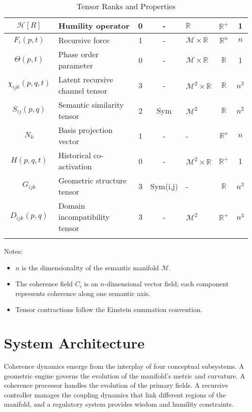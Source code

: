 {\begin{longtable}{|c|p{5.5cm}|c|c|p{1.5cm}|c|c|}
\hline
\(\mathcal{H}[R]\) & Humility operator & 0 & - & \(\mathbb{R}\) & \(\mathbb{R}^+\) & 1 \\
\hline
\(F_i(p,t)\) & Recursive force & 1 & - & \(\mathcal{M} \times \mathbb{R}\) & \(\mathbb{R}^n\) & \(n\) \\
\hline
\(\Theta(p,t)\) & Phase order parameter & 0 & - & \(\mathcal{M} \times \mathbb{R}\) & \(\mathbb{R}\) & 1 \\
\hline
\(\chi_{ijk}(p,q,t)\) & Latent recursive channel tensor & 3 & - & \(\mathcal{M}^2 \times \mathbb{R}\) & \(\mathbb{R}\) & \(n^3\) \\
\hline
\(S_{ij}(p,q)\) & Semantic similarity tensor & 2 & Sym & \(\mathcal{M}^2\) & \(\mathbb{R}\) & \(n^2\) \\
\hline
\(N_k\) & Basis projection vector & 1 & - & - & \(\mathbb{R}^n\) & \(n\) \\
\hline
\(H(p,q,t)\) & Historical co-activation & 0 & - & \(\mathcal{M}^2 \times \mathbb{R}\) & \(\mathbb{R}^+\) & 1 \\
\hline
\(G_{ijk}\) & Geometric structure tensor & 3 & Sym(i,j) & - & \(\mathbb{R}\) & \(n^3\) \\
\hline
\(D_{ijk}(p,q)\) & Domain incompatibility tensor & 3 & - & \(\mathcal{M}^2\) & \(\mathbb{R}^+\) & \(n^3\) \\
\hline
\caption{Tensor Ranks and Properties}
\end{longtable}
}

Notes:
\begin{itemize}
    \item \(n\) is the dimensionality of the semantic manifold \(\mathcal{M}\).
    \item The coherence field \(C_i\) is an \(n\)-dimensional vector field; each component represents coherence along one semantic axis.
    \item Tensor contractions follow the Einstein summation convention.
\end{itemize}

\section{System Architecture}

Coherence dynamics emerge from the interplay of four conceptual subsystems. A geometric engine governs the evolution of the manifold's metric and curvature. A coherence processor handles the evolution of the primary fields. A recursive controller manages the coupling dynamics that link different regions of the manifold, and a regulatory system provides wisdom and humility constraints.

